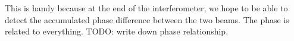 This is handy because at the end of the interferometer, we hope to be able to detect the accumulated phase difference between the two beams. The phase is related to everything. TODO: write down phase relationship. 
%
%
